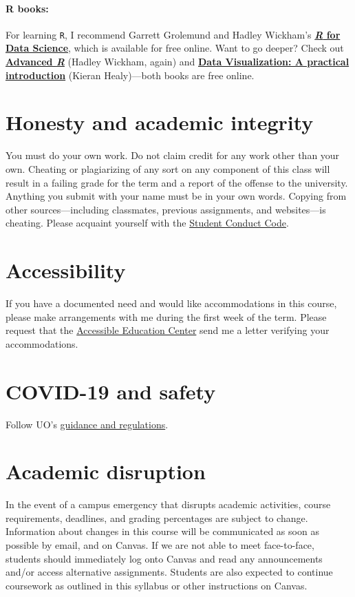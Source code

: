 \documentclass[10pt]{article}
\begin{document}
\paragraph{R books:} For learning \texttt{R}, I recommend Garrett Grolemund and Hadley Wickham's \href{http://r4ds.had.co.nz}{\textbf{\textit{R} for Data Science}}, which is available for free online. Want to go deeper? Check out \href{http://adv-r.had.co.nz/}{\textbf{Advanced \textit{R}}} (Hadley Wickham, again) and \href{http://socviz.co/}{\textbf{Data Visualization: A practical introduction}} (Kieran Healy)---both books are free online.

\section*{Honesty and academic integrity}

You must do your own work. Do not claim credit for any work other than your own. Cheating or plagiarizing of any sort on any component of this class will result in a failing grade for the term and a report of the offense to the university. Anything you submit with your name must be in your own words. Copying from other sources---including classmates, previous assignments, and websites---is cheating. Please acquaint yourself with the \href{http://studentlife.uoregon.edu}{Student Conduct Code}.

\section*{Accessibility}

If you have a documented need and would like accommodations in this course, please make arrangements with me during the first week of the term. Please request that the \href{https://aec.uoregon.edu/}{Accessible Education Center} send me a letter verifying your accommodations.

\section*{COVID-19 and safety}

Follow UO's \href{https://coronavirus.uoregon.edu}{guidance and regulations}.

\section*{Academic disruption}

In the event of a campus emergency that disrupts academic activities, course requirements, deadlines, and grading percentages are subject to change. Information about changes in this course will be communicated as soon as possible by email, and on Canvas. If we are not able to meet face-to-face, students should immediately log onto Canvas and read any announcements and/or access alternative assignments. Students are also expected to continue coursework as outlined in this syllabus or other instructions on Canvas.
\end{document}
